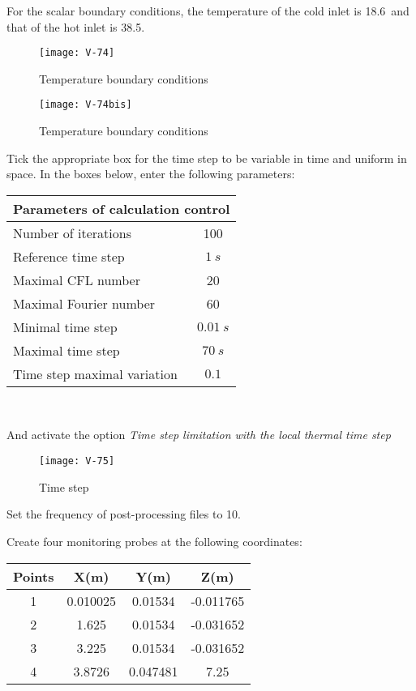 \newpage
For the scalar boundary conditions, the temperature of the cold inlet is
18.6\degresC\ and that of the hot inlet is 38.5\degresC.

\begin{figure}[h!]
\begin{center}
\texttt{[image: V-74]}
\caption{Temperature boundary conditions}
\label{fig8_e5}
\end{center}
\end{figure}

\begin{figure}[h!]
\begin{center}
\texttt{[image: V-74bis]}
\caption{Temperature boundary conditions}
\label{fig8_e5}
\end{center}
\end{figure}

\newpage
Tick the appropriate box for the time step to be variable in time and uniform in
space. In the boxes below, enter the following parameters:
\begin{center}
\begin{tabular}{|l|c|}
\hline
\multicolumn{2}{|c|}{Parameters of calculation control} \\
\hline
Number of iterations & 100 \\
\hline
Reference time step & $1\ s$ \\
\hline
Maximal CFL number & 20 \\
\hline
Maximal Fourier number & 60 \\
\hline
Minimal time step & $0.01\ s$ \\
\hline
Maximal time step & $70\ s$ \\
\hline
Time step maximal variation & $0.1$ \\
\hline
\end{tabular}\\
\end{center}

And activate the option
{\itshape Time step limitation with the local thermal time step}

\begin{figure}[h!]
\begin{center}
\texttt{[image: V-75]}
\caption{Time step}
\label{fig11_e5}
\end{center}
\end{figure}


\newpage
Set the frequency of post-processing files to 10.

Create four monitoring probes at the following coordinates:
\begin{center}
\begin{tabular}{|c|c|c|c|}
\hline
Points & X(m) & Y(m) & Z(m)\\
\hline
1 & 0.010025 & 0.01534 & -0.011765 \\
\hline
2 & 1.625 & 0.01534 & -0.031652 \\
\hline
3 & 3.225 & 0.01534 & -0.031652 \\
\hline
4 & 3.8726 & 0.047481 & 7.25 \\
\hline
\end{tabular}
\end{center}

